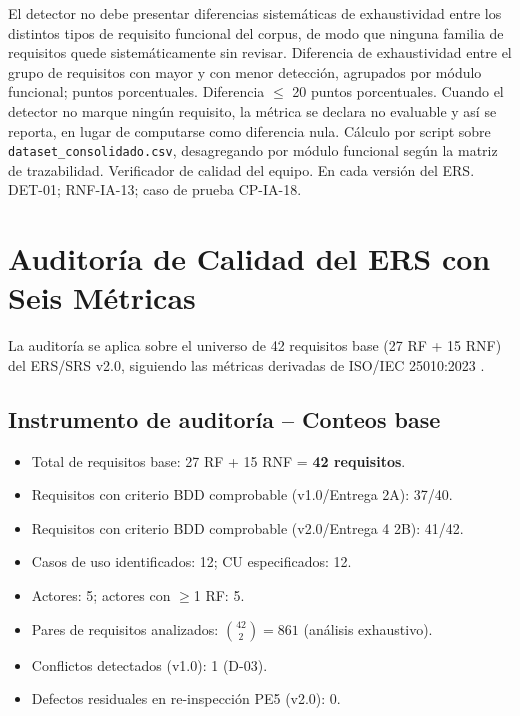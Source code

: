 \documentclass[11pt,a4paper]{article}
\begin{document}
{El detector no debe presentar diferencias sistemáticas de exhaustividad entre
los distintos tipos de requisito funcional del corpus, de modo que ninguna
familia de requisitos quede sistemáticamente sin revisar.}
{Diferencia de exhaustividad entre el grupo de requisitos con mayor y con menor
detección, agrupados por módulo funcional; puntos porcentuales.}
{Diferencia $\leq$ 20 puntos porcentuales. Cuando el detector no marque ningún
requisito, la métrica se declara no evaluable y así se reporta, en lugar de
computarse como diferencia nula.}
{Cálculo por script sobre \texttt{dataset\_consolidado.csv}, desagregando por
módulo funcional según la matriz de trazabilidad.}
{Verificador de calidad del equipo.}
{En cada versión del ERS.}
{DET-01; RNF-IA-13; caso de prueba CP-IA-18.}


\section{Auditoría de Calidad del ERS con Seis Métricas}

La auditoría se aplica sobre el universo de 42 requisitos base (27 RF + 15 RNF) del ERS/SRS v2.0, siguiendo las métricas derivadas de ISO/IEC 25010:2023 \cite{iso25010}.

\subsection{Instrumento de auditoría -- Conteos base}

\begin{itemize}[nosep]
\item Total de requisitos base: 27 RF + 15 RNF = \textbf{42 requisitos}.
\item Requisitos con criterio BDD comprobable (v1.0/Entrega 2A): 37/40.
\item Requisitos con criterio BDD comprobable (v2.0/Entrega 4 2B): 41/42.
\item Casos de uso identificados: 12; CU especificados: 12.
\item Actores: 5; actores con $\geq$1 RF: 5.
\item Pares de requisitos analizados: $\binom{42}{2} = 861$ (análisis exhaustivo).
\item Conflictos detectados (v1.0): 1 (D-03).
\item Defectos residuales en re-inspección PE5 (v2.0): 0.
\end{itemize}
\end{document}
